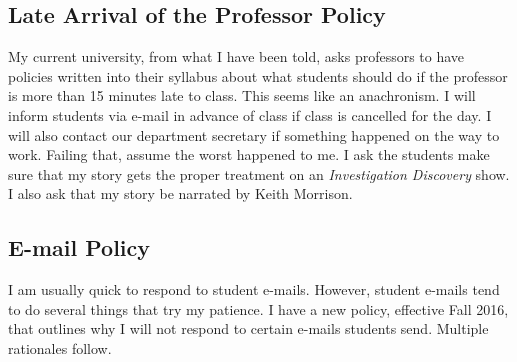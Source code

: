 \documentclass[11pt,]{article}
\begin{document}
\hypertarget{late-arrival-of-the-professor-policy}{%
\subsection{Late Arrival of the Professor
Policy}\label{late-arrival-of-the-professor-policy}}

My current university, from what I have been told, asks professors to
have policies written into their syllabus about what students should do
if the professor is more than 15 minutes late to class. This seems like
an anachronism. I will inform students via e-mail in advance of class if
class is cancelled for the day. I will also contact our department
secretary if something happened on the way to work. Failing that, assume
the worst happened to me. I ask the students make sure that my story
gets the proper treatment on an \emph{Investigation Discovery} show. I
also ask that my story be narrated by Keith Morrison.

\hypertarget{e-mail-policy}{%
\subsection{E-mail Policy}\label{e-mail-policy}}

I am usually quick to respond to student e-mails. However, student
e-mails tend to do several things that try my patience. I have a new
policy, effective Fall 2016, that outlines why I will not respond to
certain e-mails students send. Multiple rationales follow.
\end{document}

